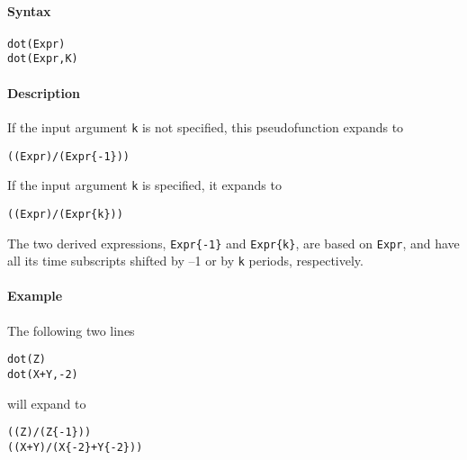 


	\paragraph{Syntax}\label{syntax}

\begin{verbatim}
dot(Expr)
dot(Expr,K)
\end{verbatim}

\paragraph{Description}\label{description}

If the input argument \texttt{k} is not specified, this pseudofunction
expands to

\begin{verbatim}
((Expr)/(Expr{-1}))
\end{verbatim}

If the input argument \texttt{k} is specified, it expands to

\begin{verbatim}
((Expr)/(Expr{k}))
\end{verbatim}

The two derived expressions, \texttt{Expr\{-1\}} and \texttt{Expr\{k\}},
are based on \texttt{Expr}, and have all its time subscripts shifted by
--1 or by \texttt{k} periods, respectively.

\paragraph{Example}\label{example}

The following two lines

\begin{verbatim}
dot(Z)
dot(X+Y,-2)
\end{verbatim}

will expand to

\begin{verbatim}
((Z)/(Z{-1}))
((X+Y)/(X{-2}+Y{-2}))
\end{verbatim}


